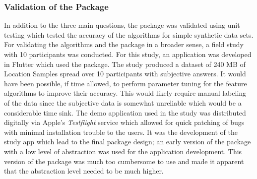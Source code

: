 \subsubsection*{Validation of the Package}
In addition to the three main questions, the package was validated using unit testing which tested the accuracy of the algorithms for simple synthetic data sets. For validating the algorithms and the package in a broader sense, a field study with 10 participants was conducted. For this study, an application was developed in Flutter which used the package. The study produced a dataset of 240 MB of Location Samples spread over 10 participants with subjective answers. It would have been possible, if time allowed, to perform parameter tuning for the feature algorithms to improve their accuracy. This would likely require manual labeling of the data since the subjective data is somewhat unreliable which would be a considerable time sink. The demo application used in the study was distributed digitally via Apple's \textit{Testflight} service which allowed for quick patching of bugs with minimal installation trouble to the users. It was the development of the study app which lead to the final package design; an early version of the package with a low level of abstraction was used for the application development. This version of the package was much too cumbersome to use and made it apparent that the abstraction level needed to be much higher. 